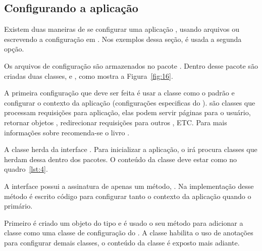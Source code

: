 
\subsection{Configurando a aplicação }

Existem duas maneiras de se configurar uma aplicação , usando arquivos  ou escrevendo a configuração em . Nos exemplos dessa seção, é usada a segunda opção.

Os arquivos de configuração são armazenados no pacote . Dentro desse pacote são criadas duas classes,  e , como mostra a Figura~\ref{fig:16}. 


A primeira configuração que deve ser feita é usar a classe  como o  padrão e configurar o contexto da aplicação (configurações especificas do ).  são classes  que processam requisições para aplicação, elas podem servir páginas para o usuário, retornar objetos , redirecionar requisições para outros , ETC. Para mais informações sobre  recomenda-se o livro .

A classe  herda da interface . Para inicializar a aplicação, o  irá procura classes que herdam dessa  dentro dos pacotes. O conteúdo da classe deve estar como no quadro~\ref{lst:4}.

A interface  possui a assinatura de apenas um método, . Na implementação desse método é escrito código para configurar tanto o contexto da aplicação quando o  primário.

Primeiro é criado um objeto do tipo  e é usado o seu método  para adicionar a classe  como uma classe de configuração do . A classe  habilita o uso de anotações  para configurar demais classes, o conteúdo da classe  é exposto mais adiante.

